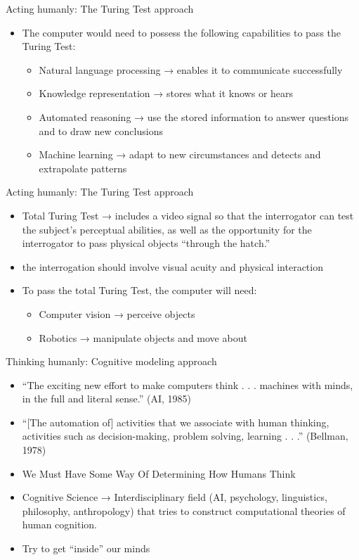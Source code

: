 \documentclass{beamer}
\begin{document}
\begin{frame}{Acting humanly: The Turing Test approach}
\begin{itemize}
\item The computer would need to possess the following capabilities to pass the Turing Test:
\begin{itemize}
\item Natural language processing → enables it to communicate successfully
\item Knowledge representation → stores what it knows or hears
\item Automated reasoning → use the stored information to answer questions and to draw new conclusions
\item Machine learning → adapt to new circumstances and detects and extrapolate patterns
\end{itemize}
\end{itemize}
\end{frame}

\begin{frame}{Acting humanly: The Turing Test approach}
\begin{itemize}
\item Total Turing Test → includes a video signal so that the interrogator can test the subject’s perceptual abilities, as well as the opportunity for the interrogator to pass physical objects “through the hatch.”
\item the interrogation should involve visual acuity and physical interaction
\item To pass the total Turing Test, the computer will need:
\begin{itemize}
\item Computer vision → perceive objects
\item Robotics → manipulate objects and move about
\end{itemize}
\end{itemize}
\end{frame}

\begin{frame}{Thinking humanly: Cognitive modeling approach}
\begin{itemize}
\item “The exciting new effort to make computers think . . . machines with minds, in the full and literal sense.” (AI, 1985)
\item “[The automation of] activities that we associate with human thinking, activities such as decision-making, problem solving, learning . . .” (Bellman, 1978)
\item We Must Have Some Way Of Determining How Humans Think
\item Cognitive Science → Interdisciplinary field (AI, psychology, linguistics, philosophy, anthropology) that tries to construct computational theories of human cognition.
\item Try to get “inside” our minds
\end{itemize}
\end{frame}
\end{document}
